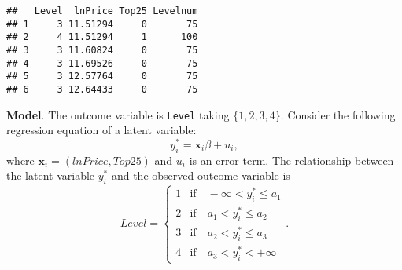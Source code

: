 \documentclass[
  12pt,
]{article}
\newenvironment{Shaded}{\begin{snugshade}}{\end{snugshade}}
\newcommand{\DataTypeTok}[1]{\textcolor[rgb]{0.13,0.29,0.53}{#1}}
\newcommand{\DecValTok}[1]{\textcolor[rgb]{0.00,0.00,0.81}{#1}}
\newcommand{\KeywordTok}[1]{\textcolor[rgb]{0.13,0.29,0.53}{\textbf{#1}}}
\newcommand{\NormalTok}[1]{#1}
\newcommand{\OperatorTok}[1]{\textcolor[rgb]{0.81,0.36,0.00}{\textbf{#1}}}
\newcommand{\OtherTok}[1]{\textcolor[rgb]{0.56,0.35,0.01}{#1}}
\newcommand{\StringTok}[1]{\textcolor[rgb]{0.31,0.60,0.02}{#1}}
\begin{document}
\begin{Shaded}
\end{Shaded}

\begin{verbatim}
##   Level  lnPrice Top25 Levelnum
## 1     3 11.51294     0       75
## 2     4 11.51294     1      100
## 3     3 11.60824     0       75
## 4     3 11.69526     0       75
## 5     3 12.57764     0       75
## 6     3 12.64433     0       75
\end{verbatim}

\noindent \textbf{Model}. The outcome variable is \texttt{Level} taking
\(\{1, 2, 3, 4\}\). Consider the following regression equation of a
latent variable: \begin{equation*}
  y_i^* = \mathbf{x}_i \beta + u_i,
\end{equation*} where \(\mathbf{x}_i = (lnPrice, Top25)\) and \(u_i\) is
an error term. The relationship between the latent variable \(y_i^*\)
and the observed outcome variable is \begin{equation*}
  Level =
  \begin{cases}
    1 &\text{if}\quad -\infty < y_i^* \le a_1  \\
    2 &\text{if}\quad a_1 < y_i^* \le a_2 \\
    3 &\text{if}\quad a_2 < y_i^* \le a_3 \\
    4 &\text{if}\quad a_3 < y_i^* < +\infty
  \end{cases}.
\end{equation*}
\end{document}

